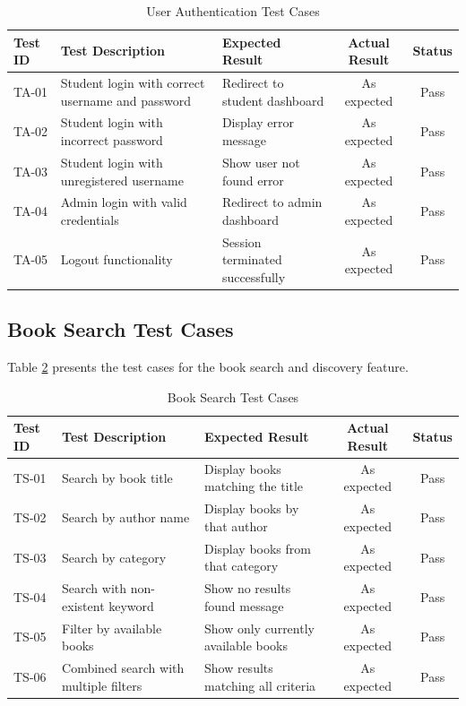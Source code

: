 \documentclass[12pt,a4paper]{report}
\begin{document}
\begin{table}[h]
\centering
\begin{tabularx}{\textwidth}{|l|X|X|c|c|}
\hline
\textbf{Test ID} & \textbf{Test Description} & \textbf{Expected Result} & \textbf{Actual Result} & \textbf{Status} \\
\hline
TA-01 & Student login with correct username and password & Redirect to student dashboard & As expected & Pass \\
\hline
TA-02 & Student login with incorrect password & Display error message & As expected & Pass \\
\hline
TA-03 & Student login with unregistered username & Show user not found error & As expected & Pass \\
\hline
TA-04 & Admin login with valid credentials & Redirect to admin dashboard & As expected & Pass \\
\hline
TA-05 & Logout functionality & Session terminated successfully & As expected & Pass \\
\hline
\end{tabularx}
\caption{User Authentication Test Cases}
\label{tab:authcases}
\end{table}

\newpage

\subsection{Book Search Test Cases}

Table \ref{tab:searchcases} presents the test cases for the book search and discovery feature.

\vspace{0.1cm}

\begin{table}[h]
\centering
\begin{tabularx}{\textwidth}{|l|X|X|c|c|}
\hline
\textbf{Test ID} & \textbf{Test Description} & \textbf{Expected Result} & \textbf{Actual Result} & \textbf{Status} \\
\hline
TS-01 & Search by book title & Display books matching the title & As expected & Pass \\
\hline
TS-02 & Search by author name & Display books by that author & As expected & Pass \\
\hline
TS-03 & Search by category & Display books from that category & As expected & Pass \\
\hline
TS-04 & Search with non-existent keyword & Show no results found message & As expected & Pass \\
\hline
TS-05 & Filter by available books & Show only currently available books & As expected & Pass \\
\hline
TS-06 & Combined search with multiple filters & Show results matching all criteria & As expected & Pass \\
\hline
\end{tabularx}
\caption{Book Search Test Cases}
\label{tab:searchcases}
\end{table}
\end{document}

